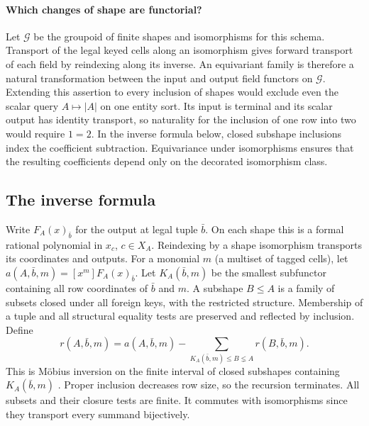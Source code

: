 \documentclass[11pt,a4paper]{article}
\theoremstyle{definition}
\theoremstyle{remark}\newaliascnt{remark}{theorem}
\numberwithin{equation}{section}
\begin{document}
\paragraph{Which changes of shape are functorial?}
Let \(\mathcal G\) be the groupoid of finite shapes and isomorphisms for this schema. Transport of the legal keyed cells along an isomorphism gives forward transport of each field by reindexing along its inverse. An equivariant family is therefore a natural transformation between the input and output field functors on \(\mathcal G\). Extending this assertion to every inclusion of shapes would exclude even the scalar query \(A\mapsto |A|\) on one entity sort. Its input is terminal and its scalar output has identity transport, so naturality for the inclusion of one row into two would require \(1=2\). In the inverse formula below, closed subshape inclusions index the coefficient subtraction. Equivariance under isomorphisms ensures that the resulting coefficients depend only on the decorated isomorphism class.

\subsection{The inverse formula}
Write $F_A(x)_{\bar b}$ for the output at legal tuple $\bar b$. On each shape this is a formal rational polynomial in $x_c$, $c\in X_A$. Reindexing by a shape isomorphism transports its coordinates and outputs. For a monomial $m$ (a multiset of tagged cells), let $a(A,\bar b,m)=[x^m]F_A(x)_{\bar b}$. Let $K_A(\bar b,m)$ be the smallest subfunctor containing all row coordinates of $\bar b$ and $m$. A subshape $B\le A$ is a family of subsets closed under all foreign keys, with the restricted structure. Membership of a tuple and all structural equality tests are preserved and reflected by inclusion. Define
\begin{equation}\label{eq:support-residual}
 r(A,\bar b,m)=a(A,\bar b,m)-
 \sum_{K_A(\bar b,m)\le B\lneq A}r(B,\bar b,m).
\end{equation}
This is M\"obius inversion on the finite interval of closed subshapes containing $K_A(\bar b,m)$ \cite{rota}. Proper inclusion decreases row size, so the recursion terminates. All subsets and their closure tests are finite. It commutes with isomorphisms since they transport every summand bijectively.
\end{document}
